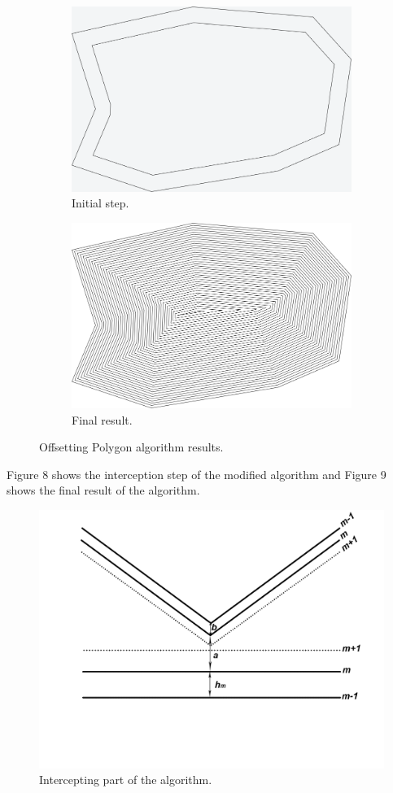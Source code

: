 \documentclass[11pt,leqno]{book}
\begin{document}
\begin{figure}[h!] 
\centering
\begin{subfigure}{.5\textwidth}
  \centering
  \includegraphics[width=.5\linewidth]{pic12.png}
  \caption{Initial step.}
  \label{fig:sub11}
\end{subfigure}%
\begin{subfigure}{.5\textwidth}
  \centering
  \includegraphics[width=.5\linewidth]{pic13.png}
  \caption{Final result.}
  \label{fig:sub12}
\end{subfigure}
\caption{Offsetting Polygon algorithm results.}
\label{fig:seven}
\end{figure}
\FloatBarrier

Figure 8 shows the interception step of the modified algorithm and Figure 9 shows the final result of the algorithm.

\begin{figure}[h!]
  \centering
  \includegraphics[width=.6\linewidth]{pic15.png}
  \caption{Intercepting part of the algorithm.}
\end{figure}
\FloatBarrier
\end{document}

